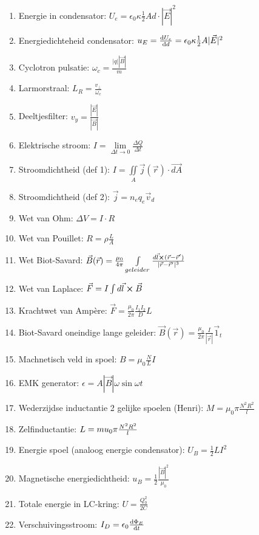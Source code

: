\documentclass[12pt]{article}
\begin{document}
\begin{enumerate}
	    \item Energie in condensator: $ U_e = \epsilon_0 \kappa \frac{1}{2} A d \cdot |\vec{E}|^2 $
	    \item Energiedichteheid condensator: $ u_E = \dv{U_e}{d} = \epsilon_0 \kappa \frac{1}{2} A |\vec{E}|^2 $
	    \item Cyclotron pulsatie: $ \omega_c = \frac{|q||\vec{B}|}{m} $
	    \item Larmorstraal: $ L_R = \frac{v_{\perp}}{\omega_c} $
	    \item Deeltjesfilter:  $v_y = \frac{|\vec{E}|}{|\vec{B}|} $
	    \item Elektrische stroom: $ I = \lim\limits_{\Delta t \to 0} \frac{ \Delta Q}{\Delta t} $
	    \item Stroomdichtheid (def 1):  $ I = \iint\limits_A \vec{j}(\vec{r})\cdot \vec{dA} $
	    \item Stroomdichtheid (def 2): $ \vec{j} = n_e q_e \vec{v}_d $
	    \item Wet van Ohm: $\Delta V = I \cdot R $
	    \item Wet van Pouillet:  $ R = \rho \frac{L}{A} $
	    \item Wet Biot-Savard: $ \vec{B}(\vec{r}) = \frac{\mu_0}{4\pi} \int\limits_{geleider} \frac{d\vec{l}\cross (\vec{r}-\vec{r}')}{|\vec{r}-\vec{r}'|^3}$
	    \item Wet van Laplace: $ \vec{F} = I \int d\vec{l}\cross \vec{B} $
	    \item Krachtwet van Amp\`ere: $ \vec{F} = \frac{\mu_0}{2\pi}\frac{I_1 I_2}{D}L $
	    \item Biot-Savard oneindige lange geleider: $ \vec{B}(\vec{r}) = \frac{\mu_0}{2\pi}\frac{I}{|\vec{r}|}\vec{1}_t$
	    \item Machnetisch veld in spoel: $ B = \mu_0 \frac{N}{L} I $
	    \item EMK generator: $ \epsilon = A |\vec{B}| \omega \sin{\omega t}$
	    \item Wederzijdse inductantie 2 gelijke spoelen (Henri): $ M = \mu_0 \pi \frac{N^2 R^2}{l} $
	    \item Zelfinductantie: $ L = \\mu_0\pi \frac{N^2R^2}{l} $
	    \item Energie spoel (analoog energie condensator): $ U_B = \frac{1}{2} LI^2 $
	    \item Magnetische energiedichtheid: $ u_B = \frac{1}{2} \frac{|\vec{B}|^2}{\mu_0} $
	    \item Totale energie in LC-kring: $ U = \frac{Q_0^2}{2C} $
	    \item Verschuivingsstroom: $ I_D = \epsilon_0 \dv{\Phi_E}{t} $ 
    \end{enumerate}
\end{document}
